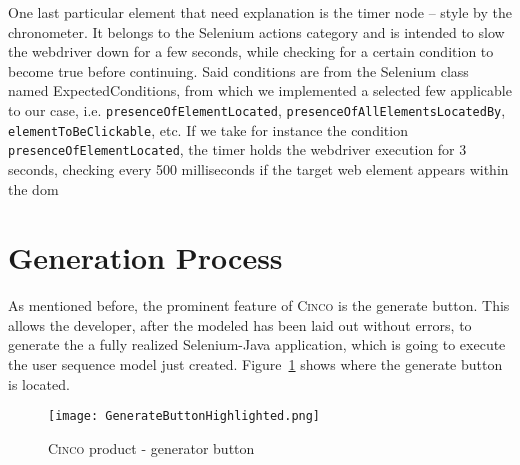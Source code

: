 One last particular element that need explanation is the timer node -- style by the chronometer. It belongs to the Selenium actions category and is intended to slow the webdriver down for a few seconds, while checking for a certain condition to become true before continuing. Said conditions are from the Selenium class named ExpectedConditions, from which we implemented a selected few applicable to our case, i.e. \lstinline{presenceOfElementLocated}, \lstinline{presenceOfAllElementsLocatedBy}, \lstinline{elementToBeClickable}, etc. If we take for instance the condition \lstinline{presenceOfElementLocated}, the timer holds the webdriver execution for 3 seconds, checking every 500 milliseconds if the target web element appears within the \acrshort{dom}

\section{Generation Process}\label{sec:GenProcess}

As mentioned before, the prominent feature of \textsc{Cinco} is the generate button. This allows the developer, after the modeled has been laid out without errors, to generate the a fully realized Selenium-Java application, which is going to execute the user sequence model just created. Figure~\ref{fig:genButton} shows where the generate button is located.

\begin{figure}[H]
    \centering
    \texttt{[image: GenerateButtonHighlighted.png]}
    \caption{\textsc{Cinco} product - generator button}
    \label{fig:genButton}
\end{figure}
